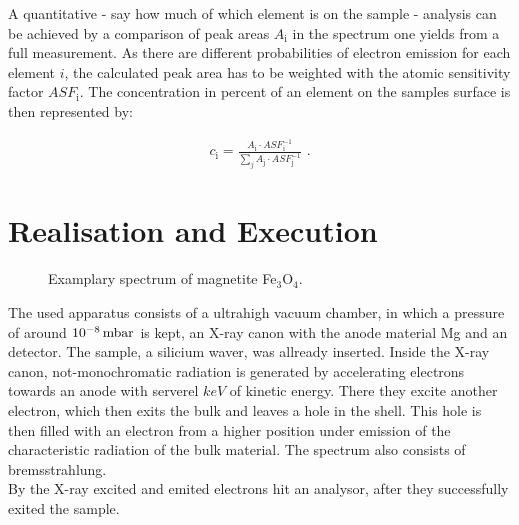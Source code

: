 \documentclass[numbers=noenddot,a4paper]{article}
\newcommand{\tenpo}[1]{ 10^{#1}}
\newcommand{\ix}[1]{_\text{#1}}
\begin{document}
			A quantitative - say how much of which element is on the sample - analysis can be achieved by a comparison of peak areas $A\ix{i}$ in the spectrum one yields from a full measurement. As there are different probabilities of electron emission for each element $i$, the calculated peak area has to be weighted with the atomic sensitivity factor $ASF\ix{i}$. The concentration in percent of an element on the samples surface is then represented by:

				\begin{align}
					c\ix{i}=\frac{A\ix{i}\cdot ASF\ix{i}^{-1}}{\sum_{j}A\ix{j}\cdot ASF\ix{j}^{-1}} \,\,.
				\end{align}

	\clearpage
	\section{Realisation and Execution}

			\begin{figure}[h]
				\centering
				\caption{Examplary spectrum of magnetite Fe$_3$O$_4$.}
				\label{img:spektr}
			\end{figure}

		The used apparatus consists of a ultrahigh vacuum chamber, in which a pressure of around $\unit[\tenpo{-8}]{mbar}$ is kept, an X-ray canon with the anode material Mg and an detector. The sample, a silicium waver, was allready inserted. Inside the X-ray canon, not-monochromatic radiation is generated by accelerating electrons towards an anode with serverel $\unit{keV}$ of kinetic energy. There they excite another electron, which then exits the bulk and leaves a hole in the shell. This hole is then filled with an electron from a higher position under emission of the characteristic radiation of the bulk material. The spectrum also consists of bremsstrahlung.\\
		By the X-ray excited and emited electrons hit an analysor, after they successfully exited the sample.\\
\end{document}
